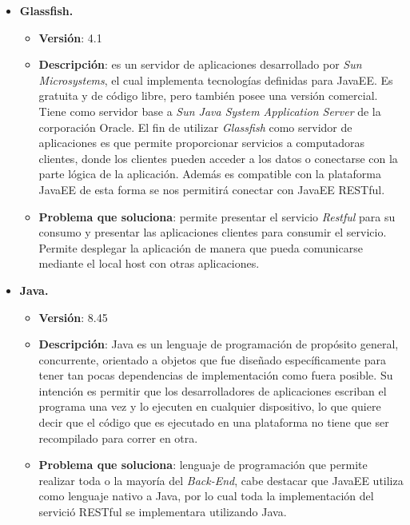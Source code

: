 \documentclass{memoria}
\begin{document}
\begin{itemize}
\item \textbf{Glassfish.}
	\begin{itemize}
	\item \textbf{Versión}: 4.1
	\item \textbf{Descripción}: es un servidor de aplicaciones desarrollado por \textsl{Sun Microsystems}, el cual implementa tecnologías definidas para JavaEE. Es gratuita y de código libre, pero también posee una versión comercial. Tiene como servidor base a \textsl{Sun Java System Application Server} de la corporación Oracle. El fin de utilizar \textsl{Glassfish} como servidor de aplicaciones es que permite proporcionar servicios a computadoras clientes, donde los clientes pueden acceder a los datos o conectarse con la parte lógica de la aplicación. Además es compatible con la plataforma JavaEE de esta forma se nos permitirá conectar con JavaEE RESTful.
	\item \textbf{Problema que soluciona}: permite presentar el servicio \textsl{Restful} para su consumo y presentar las aplicaciones clientes para consumir el servicio. Permite desplegar la aplicación de manera que pueda comunicarse mediante el local host con otras aplicaciones.
	\end{itemize}

\item \textbf{Java.}
	\begin{itemize}
	\item \textbf{Versión}: 8.45
	\item \textbf{Descripción}: Java es un lenguaje de programación de propósito general, concurrente, orientado a objetos que fue diseñado específicamente para tener tan pocas dependencias de implementación como fuera posible. Su intención es permitir que los desarrolladores de aplicaciones escriban el programa una vez y lo ejecuten en cualquier dispositivo, lo que quiere decir que el código que es ejecutado en una plataforma no tiene que ser recompilado para correr en otra.
	\item \textbf{Problema que soluciona}: lenguaje de programación que permite realizar toda o la mayoría del \textsl{Back-End}, cabe destacar que JavaEE utiliza como lenguaje nativo a Java, por lo cual toda la implementación del servició  RESTful se implementara utilizando Java.
	\end{itemize}
	

\end{itemize}
\end{document}
